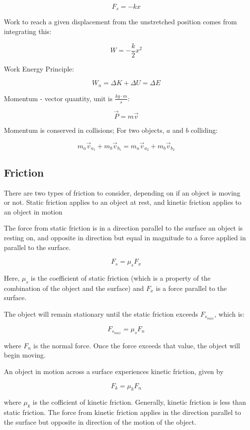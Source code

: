 \documentclass{article}
\begin{document}
\[ F_s = -kx \]

Work to reach a given displacement from the unstretched position comes from integrating this:

\[ W = -\frac{k}{2} x^2 \]

Work Energy Principle:

\[ W_n = \Delta K + \Delta U = \Delta E \]

Momentum - \@{vector} quantity, unit is $\frac{kg \cdot m}{s}$:

\[ \vec{P} = m\vec{v} \]

Momentum is conserved in collisions; For two objects, $a$ and $b$ colliding:

\[ m_{a} \vec{v}_{a_1} + m_{b} \vec{v}_{b_1} = m_{a} \vec{v}_{a_2} + m_{b} \vec{v}_{b_2} \]

\subsection{Friction}

There are two types of friction to consider, depending on if an object is moving or not. Static friction applies to an object at rest, and kinetic friction applies to an object in motion

The force from static friction is in a direction parallel to the surface an object is resting on, and opposite in direction but equal in magnitude to a force applied in parallel to the surface.

\[ F_s = \mu_s F_x \]

Here, $\mu_s$ is the coefficient of static friction (which is a property of the combination of the object and the surface) and $F_x$ is a force parallel to the surface.

The object will remain stationary until the static friction exceeds $F_{s_{max}}$, which is:

\[ F_{s_{max}} = \mu_s F_n \]

where $F_n$ is the normal force. Once the force exceeds that value, the object will begin moving.

An object in motion across a surface experiences kinetic friction, given by

\[ F_k = \mu_k F_n \]

where $\mu_k$ is the cofficient of kinetic friction. Generally, kinetic friction is less than static friction. The force from kinetic friction applies in the direction parallel to the surface but opposite in direction of the motion of the object.
\end{document}
